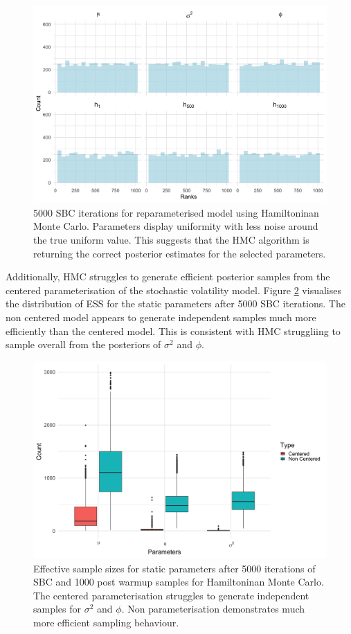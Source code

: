 \documentclass[12pt, a4paper]{article}
\begin{document}
    \begin{figure}[H]
        \centering
        \includegraphics[scale=0.09]{results/hmc_ncp_5k.png}
        \caption{5000 SBC iterations for reparameterised model using Hamiltoninan Monte Carlo. Parameters display uniformity with less noise around the true uniform value. This suggests that the HMC algorithm is returning the correct posterior estimates for the selected parameters.}
        \label{fig:ncphmc5k}
    \end{figure}

    Additionally, HMC struggles to generate efficient posterior samples from the centered parameterisation of the stochastic volatility model. Figure \ref{fig:hmcess} visualises the distribution of ESS for the static parameters after 5000 SBC iterations. The non centered model appears to generate independent samples much more efficiently than the centered model. This is consistent with HMC struggliing to sample overall from the posteriors of $\sigma^2$ and $\phi$.

    \begin{figure}[H]
        \centering
        \includegraphics[scale=0.09]{results/hmc_ess.png}
        \caption{Effective sample sizes for static parameters after 5000 iterations of SBC and 1000 post warmup samples for Hamiltoninan Monte Carlo. The centered parameterisation struggles to generate independent samples for $\sigma^2$ and $\phi$. Non parameterisation demonstrates much more efficient sampling behaviour.}
        \label{fig:hmcess}
    \end{figure}
\end{document}
